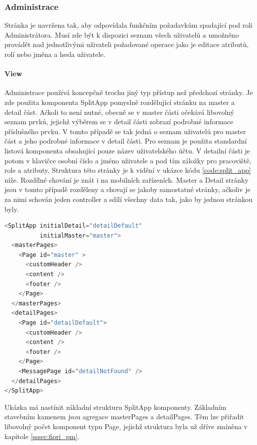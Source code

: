 \documentclass[thesis=M,czech]{FITthesis}[2012/06/26]
\begin{document}
\subsubsection{Administrace}
\label{sssec:fiori_administrace}
Stránka je navržena tak, aby odpovídala funkčním požadavkům spadající pod roli Administrátora. Musí zde být k dispozici seznam všech uživatelů a umožněno provádět nad jednotlivými uživateli požadované operace jako je editace atributů, rolí nebo jména a hesla uživatele.
\paragraph{View}
Administrace používá koncepčně trochu jiný typ přístup než předchozí stránky. Je zde použita komponenta SplitApp pomyslně rozdělující stránku na master a detail část. Ačkoli to není nutné, obecně se v master části očekává libovolný seznam prvků, jejichž výběrem se v detail části zobrazí podrobné informace příslušného prvku. V tomto případě se tak jedná o seznam uživatelů pro master část a jeho podrobné informace v detail části. Pro seznam je použita standardní listová komponenta obsahující pouze název uživatelského účtu. V detailní části je potom v hlavičce osobní číslo a jméno uživatele a pod tím záložky pro pracoviště, role a atributy. Struktura této stránky je k vidění v ukázce kódu \ref{code:split_app} níže. 
Rozdílné chování je znát i na mobilních zařízeních. Master a Detail stránky jsou v tomto případě rozděleny a chovají se jakoby samostatné stránky, ačkoliv je za nimi schován jeden controller a sdílí všechny data tak, jako by jednou stránkou byly. 
\begin{algorithm}[H]
	\begin{lstlisting}[language=java]      
<SplitApp initialDetail="detailDefault" 
          initialMaster="master">
  <masterPages>
    <Page id="master" >
      <customHeader /> 
      <content />
      <footer />
    </Page>
  </masterPages>
  <detailPages>
    <Page id="detailDefault">
      <customHeader /> 
      <content />
      <footer />
    </Page>
    <MessagePage id="detailNotFound" />
  </detailPages>
</SplitApp>
	\end{lstlisting}
	\caption{}
	\label{code:split_app}
	\small Ukázka má nastínit základní strukturu SplitApp komponenty. Základním stavebním kamenem jsou agregace masterPages a detailPages. Těm lze přiřadit libovolný počet komponent typu Page, jejichž struktura byla už dříve zmíněna v kapitole \ref{sssec:fiori_pm}.
\end{algorithm}	
\end{document}
